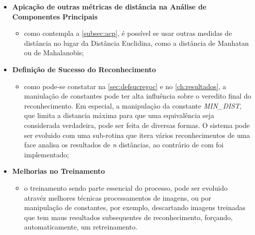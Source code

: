 \begin{itemize}	
	\item \textbf{Apicação de outras métricas de distância na Análise de Componentes Principais}
	\begin{itemize}	
		\item como contempla a \autoref{subsec:acp}, é possível se usar outras medidas de distância no lugar da Distância Euclidina, como a distância de Manhatan ou de Mahalanobis;
	\end{itemize}
	
	\item \textbf{Definição de Sucesso do Reconhecimento}
	\begin{itemize}	
		\item como pode-se constatar na \autoref{sec:defsucregoc} e no \autoref{ch:resultados}, a maniulação de constantes pode ter alta influência sobre o veredito final do reconhecimento. Em especial, a manipulaçào da constante \textit{MIN\_DIST}, que limita a distancia máxima para que uma equivalência seja considerada verdadeira, pode ser feita de diversas formas. O sistema pode ser evoluido com uma sub-rotina que itera vários reconhecimentos de uma face analisa os resultados de \textit{n} distâncias, ao contrário de com foi implementado;
	\end{itemize}
	
	\item \textbf{Melhorias no Treinamento}
	\begin{itemize}	
		\item o treinamento sendo parte essencial do processo, pode ser evoluido atravéz melhores técnicas processamentos de imagens, ou por manipulação de constantes, por exemplo, descartando imagens treinadas que tem maus resultados subsequentes de reconhecimento, forçando, automaticamente, um retreinamento.
	\end{itemize}
\end{itemize}